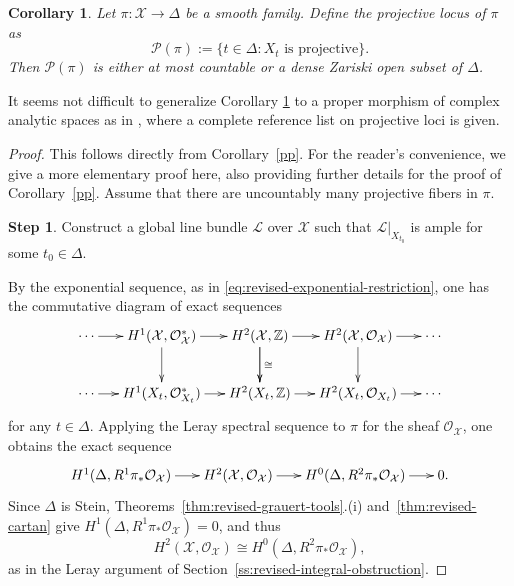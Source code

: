 \documentclass[11pt]{amsart}
\numberwithin{equation}{section}
\theoremstyle{plain}
\newtheorem{cor}[thm]{Corollary}
\theoremstyle{definition}
\newtheorem{step}{Step}
\newcommand{\cL}{\mathcal L}
\newcommand{\cO}{\mathcal O}
\newcommand{\cX}{\mathcal X}
\begin{document}
\begin{cor}\label{main theorem1}
Let $\pi: \mathcal{X}\rightarrow\Delta$ be a smooth family. Define the \emph{projective locus} of $\pi$ as
$$\mathcal{P}(\pi):= \{t\in \Delta: \text{$X_{t}$ is projective}\}.$$
Then $\mathcal{P}(\pi)$ is either at most countable or a dense Zariski open subset of $\Delta$.
\end{cor}
It seems not difficult to generalize Corollary \ref{main theorem1} to a proper morphism of complex analytic spaces as in \cite[Section 5]{Ko22b}, where a complete reference list on projective loci is given.
\begin{proof}
This follows directly from Corollary~\ref{pp}. For the reader's convenience, we give a more elementary proof here, also providing further details for the proof of Corollary~\ref{pp}.
Assume that there are uncountably many projective fibers in $\pi$.

\setcounter{step}{0}
\renewcommand{\thestep}{(\Roman{step})} %
\begin{step}\label{step41}
Construct a global line bundle $\cL$ over ${\cX}$ such that $\cL|_{X_{t_0}}$ is ample for some $t_0\in\Delta$.
\end{step}

By the exponential sequence, as in
\eqref{eq:revised-exponential-restriction}, one has the commutative
diagram of exact sequences
\begin{equation*}
\xymatrix@C=0.5cm{
  \cdots \ar[r]^{}
  & H^1(\mathcal{X}, \mathcal{O}^{*}_{\mathcal{X}})\ar[d]_{} \ar[r]^{}
  & H^2(\mathcal{X}, \mathbb{Z}) \ar[d]_{} \ar[r]^{}\ar[d]^{\cong}
  & H^2(\mathcal{X}, \mathcal{O}_{\mathcal{X}})\ar[d]\ar[r]^{} & \cdots \\
   \cdots \ar[r]
  &H^{1}({X_{t}},\mathcal{O}_{X_{t}}^*) \ar[r]^{}
  & H^{2}(X_{t},\mathbb{Z}) \ar[r]
  & H^{2}(X_{t},\mathcal{O}_{{X_{t}}})\ar[r]&\cdots}
\end{equation*}
for any $t\in \Delta$.
Applying the Leray spectral sequence to $\pi$ for the sheaf $\cO_{{\cX}}$, one obtains the exact sequence
$$\xymatrix@C=0.6cm{
   H^1(\Delta,R^1\pi_*\cO_{{\cX}})\ar[r] & H^2({\cX},\cO_{{\cX}}) \ar[r]^{} & H^0(\Delta,R^2\pi_*\cO_{{\cX}}) \ar[r]  & 0. }
$$
Since $\Delta$ is Stein, Theorems~\ref{thm:revised-grauert-tools}.\textup{(i)}
and~\ref{thm:revised-cartan} give
$H^{1}(\Delta,R^1\pi_*\cO_{{\cX}})=0$, and thus
$$H^2({\cX},\cO_{{\cX}})\cong H^0(\Delta,R^2\pi_*\cO_{{\cX}}),$$
as in the Leray argument of
Section~\ref{ss:revised-integral-obstruction}.


\end{proof}
\end{document}
